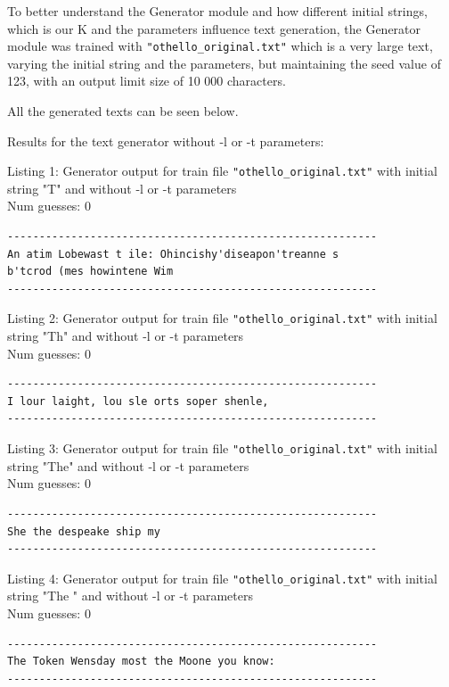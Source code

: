 \documentclass{article}
\begin{document}
To better understand the Generator module and how different initial strings, which is our K and the parameters influence
text generation, the Generator module was trained with \verb|"othello_original.txt"| which is a very large text, varying the initial string and the parameters, but
maintaining the seed value of 123, with an output limit size of 10 000 characters.

All the generated texts can be seen below.


Results for the text generator without -l or -t parameters:

\hfill

Listing 1: Generator output for train file \verb|"othello_original.txt"| with initial string "T" and without -l or -t parameters
\\Num guesses: 0

\begin{lstlisting}
----------------------------------------------------------
An atim Lobewast t ile: Ohincishy'diseapon'treanne s 
b'tcrod (mes howintene Wim
----------------------------------------------------------
\end{lstlisting}

Listing 2: Generator output for train file \verb|"othello_original.txt"| with initial string "Th" and without -l or -t parameters
\\Num guesses: 0

\begin{lstlisting}
----------------------------------------------------------
I lour laight, lou sle orts soper shenle,
----------------------------------------------------------
\end{lstlisting}

Listing 3: Generator output for train file \verb|"othello_original.txt"| with initial string "The" and without -l or -t parameters
\\Num guesses: 0

\begin{lstlisting}
----------------------------------------------------------
She the despeake ship my
----------------------------------------------------------
\end{lstlisting}

Listing 4: Generator output for train file \verb|"othello_original.txt"| with initial string "The " and without -l or -t parameters
\\Num guesses: 0

\begin{lstlisting}
----------------------------------------------------------
The Token Wensday most the Moone you know:
----------------------------------------------------------
\end{lstlisting}
\end{document}
